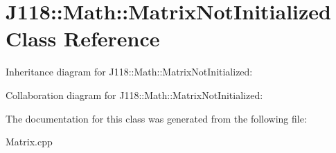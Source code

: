\hypertarget{class_j118_1_1_math_1_1_matrix_not_initialized}{}\section{J118\+:\+:Math\+:\+:Matrix\+Not\+Initialized Class Reference}
\label{class_j118_1_1_math_1_1_matrix_not_initialized}


Inheritance diagram for J118\+:\+:Math\+:\+:Matrix\+Not\+Initialized\+:


Collaboration diagram for J118\+:\+:Math\+:\+:Matrix\+Not\+Initialized\+:


The documentation for this class was generated from the following file\+:\begin{DoxyCompactItemize}
\item 
Matrix.\+cpp\end{DoxyCompactItemize}
